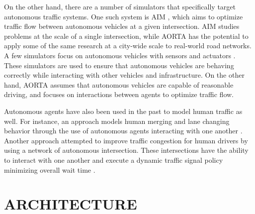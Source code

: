 \documentclass[letterpaper, 10 pt, conference]{ieeeconf}  %
\begin{document}
On the other hand, there are a number of simulators that specifically target autonomous traffic systems. One such system is AIM \cite{JAIR08-dresner}, which aims to optimize traffic flow between autonomous vehicles at a given intersection. AIM studies problems at the scale of a single intersection, while AORTA has the potential to apply some of the same research at a city-wide scale to real-world road networks. A few simulators focus on autonomous vehicles with sensors and actuators \cite{figueiredo2009approach}. These simulators are used to ensure that autonomous vehicles are behaving correctly while interacting with other vehicles and infrastructure. On the other hand, AORTA assumes that autonomous vehicles are capable of reasonable driving, and focuses on interactions between agents to optimize traffic flow. 

Autonomous agents have also been used in the past to model human traffic as well. For instance, an approach models human merging and lane changing behavior through the use of autonomous agents interacting with one another \cite{hidas2002modelling}. Another approach attempted to improve traffic congestion for human drivers by using a network of autonomous intersection. These intersections have the ability to interact with one another and execute a dynamic traffic signal policy minimizing overall wait time \cite{manikonda2001autonomous}.





\section{ARCHITECTURE}
\end{document}
